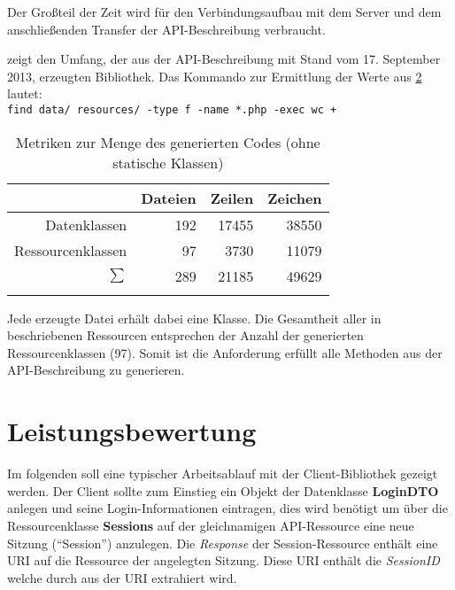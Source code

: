 Der Großteil der Zeit wird für den Verbindungsaufbau mit dem Server und dem anschließenden Transfer der \gls{API}-Beschreibung verbraucht.

 zeigt den Umfang, der aus der \gls{API}-Beschreibung mit Stand vom 17. September 2013, erzeugten Bibliothek.
Das Kommando zur Ermittlung der Werte aus \cref{tab:code_metrics} lautet:\\
\texttt{find data/ resources/ -type f -name *.php -exec wc {} +}

\begin{table}
    \begin{longtable}{r r r r}
        \toprule
        \rowcolor{lightgray}
                          & \textbf{Dateien}  & \textbf{Zeilen}     & \textbf{Zeichen}\\
        \midrule
        Datenklassen      & 192               & 17455               & 38550\\
        Ressourcenklassen & 97                & 3730                & 11079\\        
        \midrule
        $\sum$            & 289               & 21185               & 49629\\
        \bottomrule
        \caption{Metriken zur Menge des generierten Codes (ohne statische Klassen)}
        \label{tab:code_metrics}
    \end{longtable} 
\end{table}

Jede erzeugte Datei erhält dabei eine Klasse. Die Gesamtheit aller in \cite{WADL} beschriebenen Ressourcen entsprechen der Anzahl der generierten Ressourcenklassen (97). Somit ist die Anforderung erfüllt alle Methoden aus der \gls{API}-Beschreibung zu generieren.

\section{Leistungsbewertung}
\label{sec:performance_measurement}


Im folgenden soll eine typischer Arbeitsablauf mit der Client-Bibliothek gezeigt werden. Der Client sollte zum Einstieg ein Objekt der Datenklasse \textbf{LoginDTO} anlegen  und seine Login-Informationen eintragen, dies wird benötigt um über die Ressourcenklasse \textbf{Sessions} auf der gleichnamigen \gls{API}-Ressource eine neue Sitzung (\enquote{Session}) anzulegen.
Die \emph{Response} der Session-Ressource enthält eine \gls{URI} auf die Ressource der angelegten Sitzung. Diese \gls{URI} enthält die \emph{SessionID} welche durch  aus der \gls{URI} extrahiert wird.

